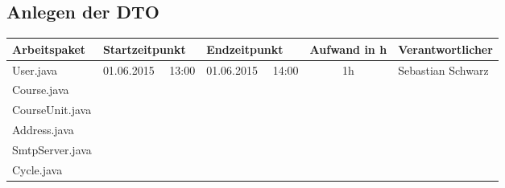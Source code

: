 \begin{landscape}
\subsection{Anlegen der DTO}
\begin{tabular}{|p{10cm}|p{3.2cm}|p{3.2cm}|c|p{3.5cm}|}
	\hline  \textbf{Arbeitspaket} & \textbf{Startzeitpunkt} & \textbf{Endzeitpunkt} & \textbf{Aufwand in h} & \textbf{Verantwortlicher} \\ 
	\hline   User.java                  & 01.06.2015 \ \ 13:00       & 01.06.2015 \ \ 14:00        & 1h                  & Sebastian Schwarz\\ 
	   Course.java                      &                            &                             &                     &\\ 
	   CourseUnit.java                  &                            &                             &                     &\\ 
	   Address.java                     &                            &                             &                     &\\ 
	   SmtpServer.java                  &                            &                             &                     &\\  
	   Cycle.java                       &                            &                             &                     &\\   
	\hline 
\end{tabular} \ \\
\ \\


\end{landscape}
